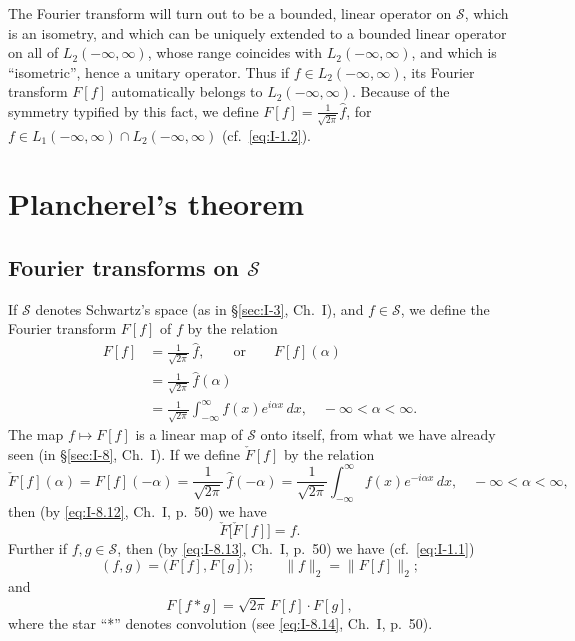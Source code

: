 The Fourier transform will turn out to be a bounded, linear operator on $\mathcal S$, which is an isometry, and which can be uniquely extended to a bounded linear operator on all of $L_{2}(-\infty,\infty)$, whose range coincides with $L_{2}(-\infty,\infty)$, and which is ``isometric'', hence a unitary operator. Thus if $f\in L_{2}(-\infty,\infty)$, its Fourier transform $F[f]$ automatically belongs to $L_{2}(-\infty,\infty)$. Because of the symmetry typified by this fact, we define $F[f]=\frac{1}{\sqrt{2\pi}}\hat f$, for $f\in L_{1}(-\infty,\infty)\cap L_{2}(-\infty,\infty)$ (cf.\ \eqref{eq:I-1.2}).

\section{Plancherel's theorem}
\label{sec:II-2}

\subsection*{Fourier transforms on $\mathcal S$}
\noindent If $\mathcal S$ denotes Schwartz's space (as in \S\ref{sec:I-3}, Ch.~I), and $f\in\mathcal S$, we define the Fourier transform $F[f]$ of $f$ by the relation
\begin{equation}\tag{2.1}\label{eq:II-2.1}
\begin{aligned}
F[f] &= \frac{1}{\sqrt{2\pi}}\,\hat f,\qquad\text{or}\qquad
F[f](\alpha)\\
&= \frac{1}{\sqrt{2\pi}}\,\hat f(\alpha)\\
&= \frac{1}{\sqrt{2\pi}}\int_{-\infty}^{\infty}f(x)e^{i\alpha x}\,dx,\quad-\infty<\alpha<\infty.
\end{aligned}
\end{equation}
The map $f\mapsto F[f]$ is a linear map of $\mathcal S$ onto itself, from what we have already seen (in \S\ref{sec:I-8}, Ch.~I). If we define $\check F[f]$ by the relation
\begin{equation}\tag{2.2}\label{eq:II-2.2}
\check F[f](\alpha)=F[f](-\alpha)=\frac{1}{\sqrt{2\pi}}\,\hat f(-\alpha)
=\frac{1}{\sqrt{2\pi}}\int_{-\infty}^{\infty}f(x)e^{-i\alpha x}\,dx,\quad-\infty<\alpha<\infty,
\end{equation}
then (by \eqref{eq:I-8.12}, Ch.~I, p.~50) we have
\begin{equation}\tag{2.3}\label{eq:II-2.3}
\check F\bigl[\check F[f]\bigr]=f.
\end{equation}
Further if $f,g\in\mathcal S$, then (by \eqref{eq:I-8.13}, Ch.~I, p.~50) we have (cf.\ \eqref{eq:I-1.1})
\begin{equation}\tag{2.4}\label{eq:II-2.4}
(f,g)=\bigl(F[f],F[g]\bigr);\qquad \|f\|_{2}=\|F[f]\|_{2};
\end{equation}
and
\begin{equation}\tag{2.5}\label{eq:II-2.5}
F[f*g]=\sqrt{2\pi}\,F[f]\cdot F[g],
\end{equation}
where the star ``*'' denotes convolution (see \eqref{eq:I-8.14}, Ch.~I, p.~50).

